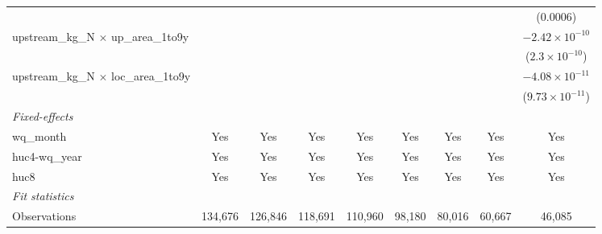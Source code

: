\begin{tabular}{lcccccccc}
                                                  &                          &                          &                          &                          &                          &                          &                          & (0.0006)\\   
   upstream\_kg\_N $\times$ up\_area\_1to9y       &                          &                          &                          &                          &                          &                          &                          & $-2.42\times 10^{-10}$\\    
                                                  &                          &                          &                          &                          &                          &                          &                          & ($2.3\times 10^{-10}$)\\    
   upstream\_kg\_N $\times$ loc\_area\_1to9y      &                          &                          &                          &                          &                          &                          &                          & $-4.08\times 10^{-11}$\\    
                                                  &                          &                          &                          &                          &                          &                          &                          & ($9.73\times 10^{-11}$)\\    
   \midrule
   \emph{Fixed-effects}\\
   wq\_month                                      & Yes                      & Yes                      & Yes                      & Yes                      & Yes                      & Yes                      & Yes                      & Yes\\  
   huc4-wq\_year                                  & Yes                      & Yes                      & Yes                      & Yes                      & Yes                      & Yes                      & Yes                      & Yes\\  
   huc8                                           & Yes                      & Yes                      & Yes                      & Yes                      & Yes                      & Yes                      & Yes                      & Yes\\  
   \midrule
   \emph{Fit statistics}\\
   Observations                                   & 134,676                  & 126,846                  & 118,691                  & 110,960                  & 98,180                   & 80,016                   & 60,667                   & 46,085\\  

\end{tabular}
